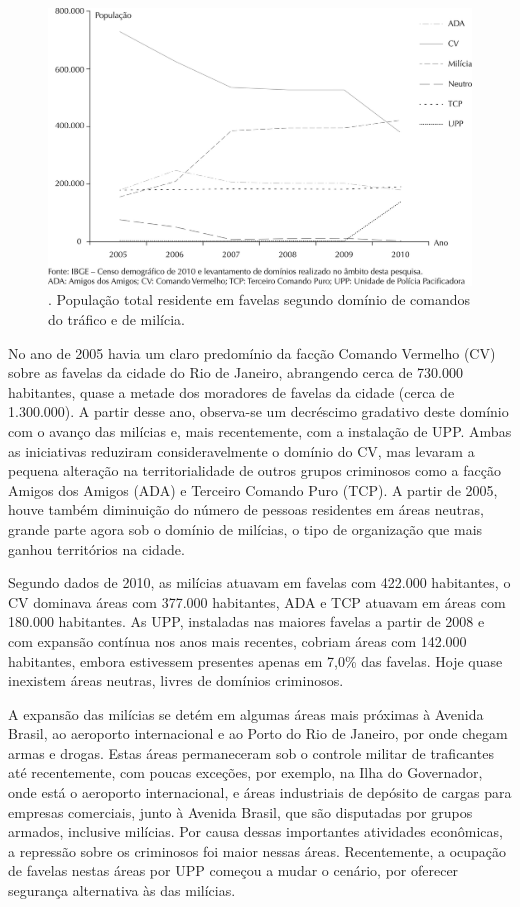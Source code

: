 \documentclass{article}
\begin{document}
\begin{figure}
\includegraphics[width=\textwidth]{0034-8910-rsp-48-01-0094-gf01}
\caption{. População total residente em favelas segundo domínio de comandos do
tráfico e de milícia.}
\end{figure}

No ano de 2005 havia um claro predomínio da facção Comando Vermelho (CV) sobre
as favelas da cidade do Rio de Janeiro, abrangendo cerca de 730.000 habitantes,
quase a metade dos moradores de favelas da cidade (cerca de 1.300.000). A partir
desse ano, observa-se um decréscimo gradativo deste domínio com o avanço das
milícias e, mais recentemente, com a instalação de UPP. Ambas as iniciativas
reduziram consideravelmente o domínio do CV, mas levaram a pequena alteração na
territorialidade de outros grupos criminosos como a facção Amigos dos Amigos
(ADA) e Terceiro Comando Puro (TCP). A partir de 2005, houve também diminuição
do número de pessoas residentes em áreas neutras, grande parte agora sob o
domínio de milícias, o tipo de organização que mais ganhou territórios na
cidade.

Segundo dados de 2010, as milícias atuavam em favelas com 422.000 habitantes, o
CV dominava áreas com 377.000 habitantes, ADA e TCP atuavam em áreas com 180.000
habitantes. As UPP, instaladas nas maiores favelas a partir de 2008 e com
expansão contínua nos anos mais recentes, cobriam áreas com 142.000 habitantes,
embora estivessem presentes apenas em 7,0\% das favelas. Hoje quase inexistem
áreas neutras, livres de domínios criminosos.

A expansão das milícias se detém em algumas áreas mais próximas à Avenida
Brasil, ao aeroporto internacional e ao Porto do Rio de Janeiro, por onde chegam
armas e drogas. Estas áreas permaneceram sob o controle militar de traficantes
até recentemente, com poucas exceções, por exemplo, na Ilha do Governador, onde
está o aeroporto internacional, e áreas industriais de depósito de cargas para
empresas comerciais, junto à Avenida Brasil, que são disputadas por grupos
armados, inclusive milícias. Por causa dessas importantes atividades econômicas,
a repressão sobre os criminosos foi maior nessas áreas. Recentemente, a ocupação
de favelas nestas áreas por UPP começou a mudar o cenário, por oferecer
segurança alternativa às das milícias.
\end{document}
